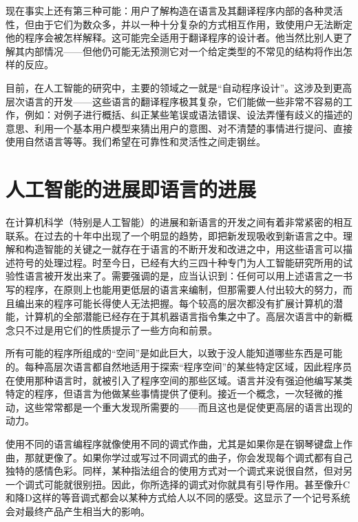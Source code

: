 现在事实上还有第三种可能：用户了解构造在语言及其翻译程序内部的各种灵活性，但由于它们为数众多，并以一种十分复杂的方式相互作用，致使用户无法断定他的程序会被怎样解释。这可能完全适用于翻译程序的设计者。他当然比别人更了解其内部情况——但他仍可能无法预测它对一个给定类型的不常见的结构将作出怎样的反应。

目前，在人工智能的研究中，主要的领域之一就是“自动程序设计”。这涉及到更高层次语言的开发——这些语言的翻译程序极其复杂，它们能做一些非常不容易的工作，例如：对例子进行概括、纠正某些笔误或语法错误、设法弄懂有歧义的描述的意思、利用一个基本用户模型来猜出用户的意图、对不清楚的事情进行提问、直接使用自然语言等等。我们希望在可靠性和灵活性之间走钢丝。

\section{人工智能的进展即语言的进展}

在计算机科学（特别是人工智能）的进展和新语言的开发之间有着非常紧密的相互联系。在过去的十年中出现了一个明显的趋势，即把新发现吸收到新语言之中。理解和构造智能的关键之一就存在于语言的不断开发和改进之中，用这些语言可以描述符号的处理过程。时至今日，已经有大约三四十种专门为人工智能研究所用的试验性语言被开发出来了。需要强调的是，应当认识到：任何可以用上述语言之一书写的程序，在原则上也能用更低层的语言来编制，但那需要人付出较大的努力，而且编出来的程序可能长得使人无法把握。每个较高的层次都没有扩展计算机的潜能，计算机的全部潜能已经存在于其机器语言指令集之中了。高层次语言中的新概念只不过是用它们的性质提示了一些方向和前景。

所有可能的程序所组成的“空间”是如此巨大，以致于没人能知道哪些东西是可能的。每种高层次语言都自然地适用于探索“程序空间”的某些特定区域，因此程序员在使用那种语言时，就被引入了程序空间的那些区域。语言并没有强迫他编写某类特定的程序，但语言为他做某些事情提供了便利。接近一个概念，一次轻微的推动，这些常常都是一个重大发现所需要的——而且这也是促使更高层的语言出现的动力。

使用不同的语言编程序就像使用不同的调式作曲，尤其是如果你是在钢琴键盘上作曲，那就更像了。如果你学过或写过不同调式的曲子，你会发现每个调式都有自己独特的感情色彩。同样，某种指法组合的使用方式对一个调式来说很自然，但对另一个调式可能就很别扭。因此，你所选择的调式对你就具有引导作用。甚至像升C和降D这样的等音调式都会以某种方式给人以不同的感受。这显示了一个记号系统会对最终产品产生相当大的影响。

